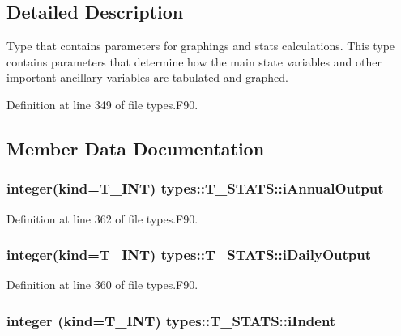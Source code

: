 \subsection{Detailed Description}
Type that contains parameters for graphings and stats calculations. This type contains parameters that determine how the main state variables and other important ancillary variables are tabulated and graphed. 

Definition at line 349 of file types.F90.



\subsection{Member Data Documentation}
\hypertarget{typetypes_1_1_t___s_t_a_t_s_a3972a731a69e531cae121f591caa8c50}{
\subsubsection[{iAnnualOutput}]{\setlength{\rightskip}{0pt plus 5cm}integer(kind={\bf T\_\-INT}) {\bf types::T\_\-STATS::iAnnualOutput}}}
\label{typetypes_1_1_t___s_t_a_t_s_a3972a731a69e531cae121f591caa8c50}


Definition at line 362 of file types.F90.

\hypertarget{typetypes_1_1_t___s_t_a_t_s_a7b4fcf742409ce0a286ec3668fa0a112}{
\subsubsection[{iDailyOutput}]{\setlength{\rightskip}{0pt plus 5cm}integer(kind={\bf T\_\-INT}) {\bf types::T\_\-STATS::iDailyOutput}}}
\label{typetypes_1_1_t___s_t_a_t_s_a7b4fcf742409ce0a286ec3668fa0a112}


Definition at line 360 of file types.F90.

\hypertarget{typetypes_1_1_t___s_t_a_t_s_a36da84bf5db7eb8d8fffac4d6ef768d8}{
\subsubsection[{iIndent}]{\setlength{\rightskip}{0pt plus 5cm}integer (kind={\bf T\_\-INT}) {\bf types::T\_\-STATS::iIndent}}}
\label{typetypes_1_1_t___s_t_a_t_s_a36da84bf5db7eb8d8fffac4d6ef768d8}


